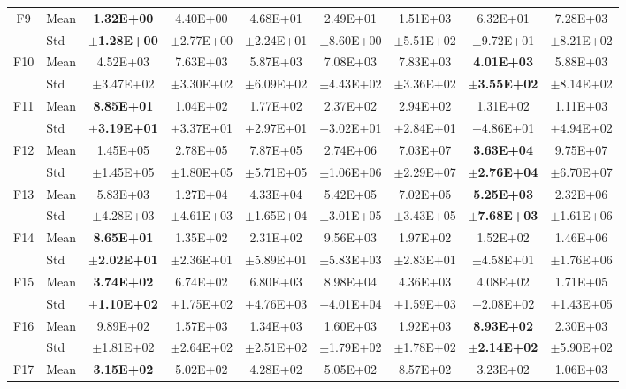 \begin{table}[htbp]
{\begin{tabular}{clccccccc}
F9 & Mean & \textbf{1.32E+00} & 4.40E+00 & 4.68E+01 & 2.49E+01 & 1.51E+03 & 6.32E+01 & 7.28E+03 \\
 & Std & $\pm$\textbf{1.28E+00} & $\pm$2.77E+00 & $\pm$2.24E+01 & $\pm$8.60E+00 & $\pm$5.51E+02 & $\pm$9.72E+01 & $\pm$8.21E+02 \\
F10 & Mean & 4.52E+03 & 7.63E+03 & 5.87E+03 & 7.08E+03 & 7.83E+03 & \textbf{4.01E+03} & 5.88E+03 \\
 & Std & $\pm$3.47E+02 & $\pm$3.30E+02 & $\pm$6.09E+02 & $\pm$4.43E+02 & $\pm$3.36E+02 & $\pm$\textbf{3.55E+02} & $\pm$8.14E+02 \\
F11 & Mean & \textbf{8.85E+01} & 1.04E+02 & 1.77E+02 & 2.37E+02 & 2.94E+02 & 1.31E+02 & 1.11E+03 \\
 & Std & $\pm$\textbf{3.19E+01} & $\pm$3.37E+01 & $\pm$2.97E+01 & $\pm$3.02E+01 & $\pm$2.84E+01 & $\pm$4.86E+01 & $\pm$4.94E+02 \\
F12 & Mean & 1.45E+05 & 2.78E+05 & 7.87E+05 & 2.74E+06 & 7.03E+07 & \textbf{3.63E+04} & 9.75E+07 \\
 & Std & $\pm$1.45E+05 & $\pm$1.80E+05 & $\pm$5.71E+05 & $\pm$1.06E+06 & $\pm$2.29E+07 & $\pm$\textbf{2.76E+04} & $\pm$6.70E+07 \\
F13 & Mean & 5.83E+03 & 1.27E+04 & 4.33E+04 & 5.42E+05 & 7.02E+05 & \textbf{5.25E+03} & 2.32E+06 \\
 & Std & $\pm$4.28E+03 & $\pm$4.61E+03 & $\pm$1.65E+04 & $\pm$3.01E+05 & $\pm$3.43E+05 & $\pm$\textbf{7.68E+03} & $\pm$1.61E+06 \\
F14 & Mean & \textbf{8.65E+01} & 1.35E+02 & 2.31E+02 & 9.56E+03 & 1.97E+02 & 1.52E+02 & 1.46E+06 \\
 & Std & $\pm$\textbf{2.02E+01} & $\pm$2.36E+01 & $\pm$5.89E+01 & $\pm$5.83E+03 & $\pm$2.83E+01 & $\pm$4.58E+01 & $\pm$1.76E+06 \\
F15 & Mean & \textbf{3.74E+02} & 6.74E+02 & 6.80E+03 & 8.98E+04 & 4.36E+03 & 4.08E+02 & 1.71E+05 \\
 & Std & $\pm$\textbf{1.10E+02} & $\pm$1.75E+02 & $\pm$4.76E+03 & $\pm$4.01E+04 & $\pm$1.59E+03 & $\pm$2.08E+02 & $\pm$1.43E+05 \\
F16 & Mean & 9.89E+02 & 1.57E+03 & 1.34E+03 & 1.60E+03 & 1.92E+03 & \textbf{8.93E+02} & 2.30E+03 \\
 & Std & $\pm$1.81E+02 & $\pm$2.64E+02 & $\pm$2.51E+02 & $\pm$1.79E+02 & $\pm$1.78E+02 & $\pm$\textbf{2.14E+02} & $\pm$5.90E+02 \\
F17 & Mean & \textbf{3.15E+02} & 5.02E+02 & 4.28E+02 & 5.05E+02 & 8.57E+02 & 3.23E+02 & 1.06E+03 \\

\end{tabular}}
\end{table}
